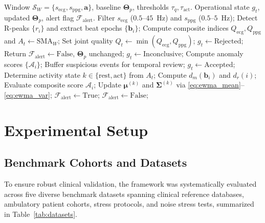 \documentclass{ieeeaccess}
\begin{document}
\begin{algorithm}[!t]
\caption{Motion-Aware Gating and Baseline Adaptation Cycle}
\label{alg:gating}
\begin{algorithmic}[1]
\REQUIRE Window $\mathcal{S}_W = \{s_{\mathrm{ecg}}, s_{\mathrm{ppg}}, \mathbf{a}\}$, baseline $\mathbf{\Theta}_p$, thresholds $\tau_q, \tau_{\mathrm{act}}$.
\ENSURE Operational state $g_t$, updated $\mathbf{\Theta}_p$, alert flag $\mathcal{F}_{\mathrm{alert}}$.
\STATE Filter $s_{\mathrm{ecg}}$ ($0.5$--$45$~Hz) and $s_{\mathrm{ppg}}$ ($0.5$--$5$~Hz);
\STATE Detect R-peaks $\{r_i\}$ and extract beat epochs $\{\mathbf{b}_i\}$;
\STATE Compute composite indices $Q_{\mathrm{ecg}}, Q_{\mathrm{ppg}}$ and $A_t \leftarrow \mathrm{SMA}_W$;
\STATE Set joint quality $Q_t \leftarrow \min(Q_{\mathrm{ecg}}, Q_{\mathrm{ppg}})$;
    \STATE $g_t \leftarrow \text{Rejected}$; 
    \STATE Return $\mathcal{F}_{\mathrm{alert}} \leftarrow \text{False}$, $\mathbf{\Theta}_p$ unchanged;
    \STATE $g_t \leftarrow \text{Inconclusive}$; 
    \STATE Compute anomaly scores $\{\mathcal{A}_i\}$;
    \STATE Buffer suspicious events for temporal review;
\ELSE
    \STATE $g_t \leftarrow \text{Accepted}$; 
    \STATE Determine activity state $k \in \{\text{rest}, \text{act}\}$ from $A_t$;
        \STATE Compute $d_m(\mathbf{b}_i)$ and $d_r(i)$;
        \STATE Evaluate composite score $\mathcal{A}_i$;
            \STATE Update $\mathbf{\mu}^{(k)}$ and $\mathbf{\Sigma}^{(k)}$ via \eqref{eq:ewma_mean}--\eqref{eq:ewma_var};
        \ENDIF
    \ENDFOR
\ENDIF
{}
    \STATE $\mathcal{F}_{\mathrm{alert}} \leftarrow \text{True}$; 
\ELSE
    \STATE $\mathcal{F}_{\mathrm{alert}} \leftarrow \text{False}$;
\ENDIF
\end{algorithmic}
\end{algorithm}

\section{Experimental Setup}
\label{sec:experimental}

\subsection{Benchmark Cohorts and Datasets}
To ensure robust clinical validation, the framework was systematically evaluated across five diverse benchmark datasets spanning clinical reference databases, ambulatory patient cohorts, stress protocols, and noise stress tests, summarized in Table~\ref{tab:datasets}.
\end{document}
